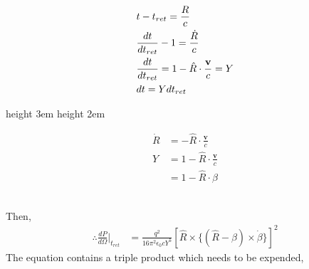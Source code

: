 \documentclass[11pt,a4paper]{article}
\begin{document}
\begin{minipage}[c]{0.60\textwidth}                                                                                               
 \begin{align}
     & t - t_{ret} = \frac{R}{c} \notag \\
     & \frac{dt}{dt_{ret}} -1 = \frac{\dot{R}}{c} \notag \\
     & \frac{dt}{dt_{ret}} = 1 - \hat{R}\cdot \frac{\mathbf{v}}{c} = Y \notag \\
     & dt = Ydt_{ret}
 \end{align}                                                                                                                       
\end{minipage}                                                                                                                    
\hspace{0.5em}\vrule height 3em \hspace{0.02em} \vrule height 2em \hspace{1em}                                                    
\begin{minipage}[c]{0.1\textwidth}                                                                                               
 \begin{align*}
     \dot{R} &= - \hat{R}\cdot \frac{\mathbf{v}}{c} \\
     Y &= 1 - \hat{R}\cdot \frac{\mathbf{v}}{c} \\
       &= 1 - \hat{R}\cdot \beta
 \end{align*}                                                                                                                      
\end{minipage}                                                                                                                    
\\
Then,
\begin{align}
    \therefore \frac{dP}{d\Omega}\biggl|_{t_{ret}} &= \frac{q^2}{16\pi^2 \epsilon_0cY^5}[\hat{R}\times \{ (\hat{R} - \beta) \times \dot{\beta} \}]^2 \label{eq52}
\end{align}
The equation contains a triple product which needs to be expended,
\end{document}
